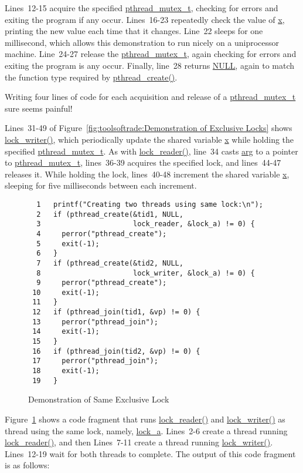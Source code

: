 Lines~12-15 acquire the specified \url{pthread_mutex_t}, checking
for errors and exiting the program if any occur.
Lines~16-23 repeatedly check the value of \url{x}, printing the new value
each time that it changes.
Line~22 sleeps for one millisecond, which allows this demonstration
to run nicely on a uniprocessor machine.
Line~24-27 release the \url{pthread_mutex_t}, again checking for
errors and exiting the program is any occur.
Finally, line~28 returns \url{NULL}, again to match the function type
required by \url{pthread_create()}.

\QuickQuiz{}
	Writing four lines of code for each acquisition and release
	of a \url{pthread_mutex_t} sure seems painful!
 \QuickQuizEnd

Lines~31-49 of
Figure~\ref{fig:toolsoftrade:Demonstration of Exclusive Locks}
shows \url{lock_writer()}, which
periodically update the shared variable \url{x} while holding the
specified \url{pthread_mutex_t}.
As with \url{lock_reader()}, line~34 casts \url{arg} to a pointer
to \url{pthread_mutex_t}, lines~36-39 acquires the specified lock,
and lines~44-47 releases it.
While holding the lock, lines~40-48 increment the shared variable \url{x},
sleeping for five milliseconds between each increment.

\begin{figure}[tbp]
{ \scriptsize
\begin{verbatim}
  1   printf("Creating two threads using same lock:\n");
  2   if (pthread_create(&tid1, NULL,
  3                      lock_reader, &lock_a) != 0) {
  4     perror("pthread_create");
  5     exit(-1);
  6   }
  7   if (pthread_create(&tid2, NULL,
  8                      lock_writer, &lock_a) != 0) {
  9     perror("pthread_create");
 10     exit(-1);
 11   }
 12   if (pthread_join(tid1, &vp) != 0) {
 13     perror("pthread_join");
 14     exit(-1);
 15   }
 16   if (pthread_join(tid2, &vp) != 0) {
 17     perror("pthread_join");
 18     exit(-1);
 19   }
\end{verbatim}
}
\caption{Demonstration of Same Exclusive Lock}
\label{fig:toolsoftrade:Demonstration of Same Exclusive Lock}
\end{figure}

Figure~\ref{fig:toolsoftrade:Demonstration of Same Exclusive Lock}
shows a code fragment that runs \url{lock_reader()} and
\url{lock_writer()} as thread using the same lock, namely, \url{lock_a}.
Lines~2-6 create a thread running \url{lock_reader()}, and then
Lines~7-11 create a thread running \url{lock_writer()}.
Lines~12-19 wait for both threads to complete.
The output of this code fragment is as follows:

